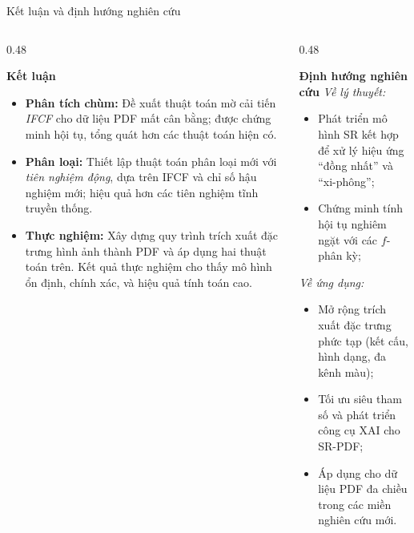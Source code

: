 \documentclass[oneside, aspectratio=169]{beamer}
\begin{document}
\begin{frame}{Kết luận và định hướng nghiên cứu}\footnotesize
	
	\begin{columns}[t,onlytextwidth]
		
		\begin{column}{0.48\textwidth}
			
			\begin{block}{\textbf{Kết luận}}
				\begin{itemize}
					\item \textbf{Phân tích chùm:} Đề xuất thuật toán mờ cải tiến \textit{IFCF} cho dữ liệu PDF mất cân bằng; được chứng minh hội tụ, tổng quát hơn các thuật toán hiện có.
					\item \textbf{Phân loại:} Thiết lập thuật toán phân loại mới với \textit{tiên nghiệm động}, dựa trên IFCF và chỉ số hậu nghiệm mới; hiệu quả hơn các tiên nghiệm tĩnh truyền thống.
					\item \textbf{Thực nghiệm:} Xây dựng quy trình trích xuất đặc trưng hình ảnh thành PDF và áp dụng hai thuật toán trên. Kết quả thực nghiệm cho thấy mô hình ổn định, chính xác, và hiệu quả tính toán cao.
				\end{itemize}
			\end{block}
			
		\end{column}
		
		\begin{column}{0.48\textwidth}\footnotesize
			
			\begin{block}{\textbf{Định hướng nghiên cứu}}
				\textit{Về lý thuyết:}
				\begin{itemize}
					\item Phát triển mô hình SR kết hợp để xử lý hiệu ứng “đồng nhất” và “xi-phông”;
					\item Chứng minh tính hội tụ nghiêm ngặt với các $f$-phân kỳ;
				\end{itemize}
				
				\textit{Về ứng dụng:}
				\begin{itemize}
					\item Mở rộng trích xuất đặc trưng phức tạp (kết cấu, hình dạng, đa kênh màu);
					\item Tối ưu siêu tham số và phát triển công cụ XAI cho SR-PDF;
					\item Áp dụng cho dữ liệu PDF đa chiều trong các miền nghiên cứu mới.
				\end{itemize}
			\end{block}
			
		\end{column}
		
	\end{columns}
	
\end{frame}
\end{document}
